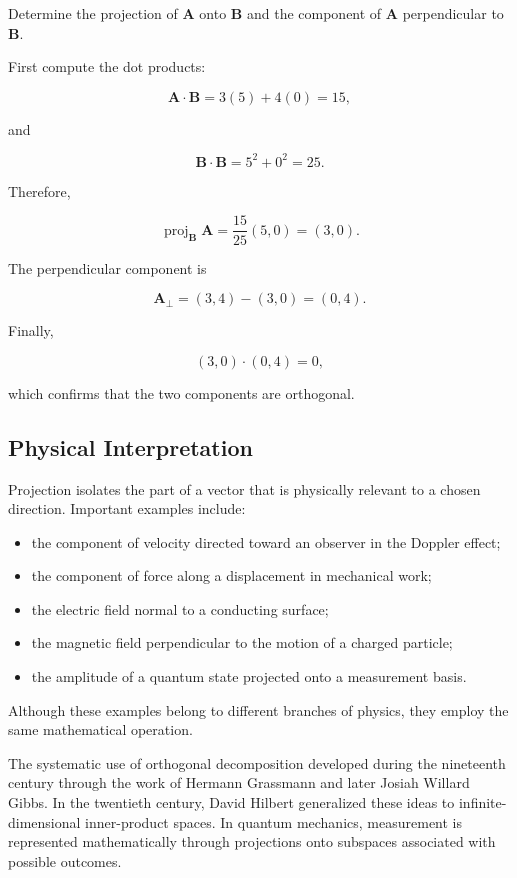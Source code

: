 Determine the projection of $\mathbf A$ onto $\mathbf B$ and the component of
$\mathbf A$ perpendicular to $\mathbf B$.

First compute the dot products:

\[
\mathbf A\cdot\mathbf B
=
3(5)+4(0)
=
15,
\]

and

\[
\mathbf B\cdot\mathbf B
=
5^2+0^2
=
25.
\]

Therefore,

\[
\operatorname{proj}_{\mathbf B}\mathbf A
=
\frac{15}{25}(5,0)
=
(3,0).
\]

The perpendicular component is

\[
\mathbf A_{\perp}
=
(3,4)-(3,0)
=
(0,4).
\]

Finally,

\[
(3,0)\cdot(0,4)=0,
\]

which confirms that the two components are orthogonal.

\subsection{Physical Interpretation}

Projection isolates the part of a vector that is physically relevant to a
chosen direction. Important examples include:

\begin{itemize}
\item the component of velocity directed toward an observer in the Doppler effect;
\item the component of force along a displacement in mechanical work;
\item the electric field normal to a conducting surface;
\item the magnetic field perpendicular to the motion of a charged particle;
\item the amplitude of a quantum state projected onto a measurement basis.
\end{itemize}

Although these examples belong to different branches of physics, they employ
the same mathematical operation.


The systematic use of orthogonal decomposition developed during the nineteenth
century through the work of Hermann Grassmann and later Josiah Willard Gibbs.
In the twentieth century, David Hilbert generalized these ideas to
infinite-dimensional inner-product spaces. In quantum mechanics, measurement
is represented mathematically through projections onto subspaces associated
with possible outcomes.

